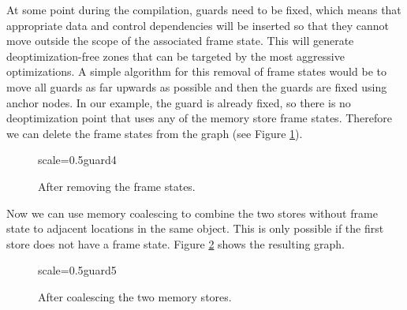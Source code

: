 \documentclass[twocolumn]{svjour3}
\begin{document}
At some point during the compilation, guards need to be fixed, which means that appropriate data and control dependencies will be inserted so that they cannot move outside the scope of the associated frame state.
This will generate deoptimization-free zones that can be targeted by the most aggressive optimizations.
A simple algorithm for this removal of frame states would be to move all guards as far upwards as possible and then the guards are fixed using anchor nodes.
In our example, the guard is already fixed, so there is no deoptimization point that uses any of the memory store frame states.
Therefore we can delete the frame states from the graph (see Figure \ref{fig:guard4}).

\begin{figure}[h]
  \centering
\begin{digraphenv}{scale=0.5}{guard4}
\end{digraphenv}
  \caption{After removing the frame states.}
  \label{fig:guard4}
\end{figure}

Now we can use memory coalescing to combine the two stores without frame state to adjacent locations in the same object.
This is only possible if the first store does not have a frame state.
Figure \ref{fig:guard5} shows the resulting graph.


\begin{figure}[h]
  \centering
\begin{digraphenv}{scale=0.5}{guard5}
\end{digraphenv}
  \caption{After coalescing the two memory stores.}
  \label{fig:guard5}
\end{figure}
\end{document}
